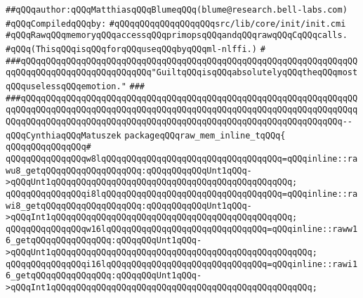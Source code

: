 \label{src/lib/core/init/rawmem.pkg}
\verb|##qQQqauthor:qQQqMatthiasqQQqBlumeqQQq(blume@research.bell-labs.com)|\newline
\newline
\verb|#qQQqCompiledqQQqby:|\newline
\verb|#qQQqqQQqqQQqqQQqqQQqsrc/lib/core/init/init.cmi|\newline
\newline
\verb|#qQQqRawqQQqmemoryqQQqaccessqQQqprimopsqQQqandqQQqrawqQQqCqQQqcalls.|\newline
\verb|#qQQq(ThisqQQqisqQQqforqQQquseqQQqbyqQQqml-nlffi.)|\newline
\verb|#|\newline
\newline
\newline
\newline
\verb|###qQQqqQQqqQQqqQQqqQQqqQQqqQQqqQQqqQQqqQQqqQQqqQQqqQQqqQQqqQQqqQQqqQQqqQQqqQQqqQQqqQQqqQQqqQQqqQQq"GuiltqQQqisqQQqabsolutelyqQQqtheqQQqmostqQQquselessqQQqemotion."|\newline
\verb|###|\newline
\verb|###qQQqqQQqqQQqqQQqqQQqqQQqqQQqqQQqqQQqqQQqqQQqqQQqqQQqqQQqqQQqqQQqqQQqqQQqqQQqqQQqqQQqqQQqqQQqqQQqqQQqqQQqqQQqqQQqqQQqqQQqqQQqqQQqqQQqqQQqqQQqqQQqqQQqqQQqqQQqqQQqqQQqqQQqqQQqqQQqqQQqqQQqqQQqqQQqqQQqqQQqqQQq--qQQqCynthiaqQQqMatuszek|\newline
\newline
\newline
\newline
\verb|packageqQQqraw_mem_inline_tqQQq{|\newline
\verb|qQQqqQQqqQQqqQQq#|\newline
\verb|qQQqqQQqqQQqqQQqw8lqQQqqQQqqQQqqQQqqQQqqQQqqQQqqQQqqQQq=qQQqinline::rawu8_getqQQqqQQqqQQqqQQqqQQq:qQQqqQQqqQQqUnt1qQQq->qQQqUnt1qQQqqQQqqQQqqQQqqQQqqQQqqQQqqQQqqQQqqQQqqQQqqQQq;|\newline
\verb|qQQqqQQqqQQqqQQqi8lqQQqqQQqqQQqqQQqqQQqqQQqqQQqqQQqqQQq=qQQqinline::rawi8_getqQQqqQQqqQQqqQQqqQQq:qQQqqQQqqQQqUnt1qQQq->qQQqInt1qQQqqQQqqQQqqQQqqQQqqQQqqQQqqQQqqQQqqQQqqQQqqQQq;|\newline
\verb|qQQqqQQqqQQqqQQqw16lqQQqqQQqqQQqqQQqqQQqqQQqqQQqqQQq=qQQqinline::raww16_getqQQqqQQqqQQqqQQq:qQQqqQQqUnt1qQQq->qQQqUnt1qQQqqQQqqQQqqQQqqQQqqQQqqQQqqQQqqQQqqQQqqQQqqQQqqQQq;|\newline
\verb|qQQqqQQqqQQqqQQqi16lqQQqqQQqqQQqqQQqqQQqqQQqqQQqqQQq=qQQqinline::rawi16_getqQQqqQQqqQQqqQQq:qQQqqQQqUnt1qQQq->qQQqInt1qQQqqQQqqQQqqQQqqQQqqQQqqQQqqQQqqQQqqQQqqQQqqQQqqQQq;|\newline
